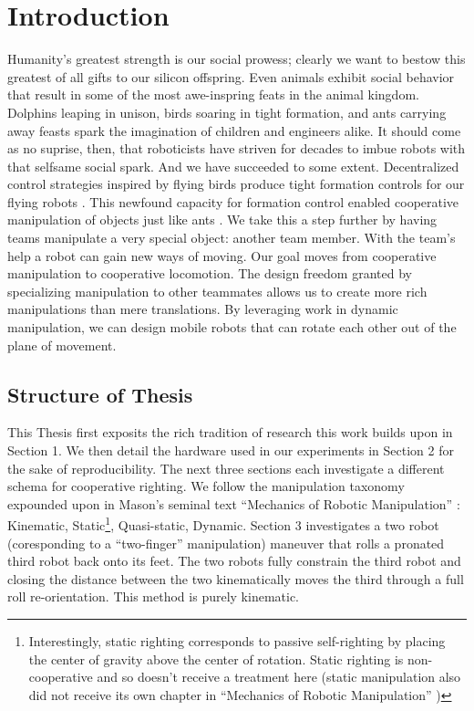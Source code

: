 \documentclass[letterpaper]{report}
\begin{document}
\section{Introduction}
Humanity's greatest strength is our social prowess; clearly we want to bestow this greatest of all gifts to our silicon offspring.
Even animals exhibit social behavior that result in some of the most awe-inspring feats in the animal kingdom.
Dolphins leaping in unison, birds soaring in tight formation, and ants carrying away feasts spark the imagination of children and engineers alike.
It should come as no suprise, then, that roboticists have striven for decades to imbue robots with that selfsame social spark.
And we have succeeded to some extent.
Decentralized control strategies inspired by flying birds \cite{reynolds1987flocks} produce tight formation controls for our flying robots \cite{RealBoids}.
This newfound capacity for formation control enabled cooperative manipulation of objects \cite{rus1995moving,sugar2002control,spletzer2001cooperative,song2002potential} just like ants \cite{kube2000cooperative}.
We take this a step further by having teams manipulate a very special object: another team member.
With the team's help a robot can gain new ways of moving.
Our goal moves from cooperative manipulation to cooperative locomotion.
The design freedom granted by specializing manipulation to other teammates allows us to create more rich manipulations than mere translations.
By leveraging work in dynamic manipulation, we can design mobile robots that can rotate each other out of the plane of movement.

\subsection{Structure of Thesis}
This Thesis first exposits the rich tradition of research this work builds upon in Section 1.
We then detail the hardware used in our experiments in Section 2 for the sake of reproducibility.
The next three sections each investigate a different schema for cooperative righting.
We follow the manipulation taxonomy expounded upon in Mason's seminal text ``Mechanics of Robotic Manipulation'' \cite{MasonMORMBook}: Kinematic, Static\footnote{Interestingly, static righting corresponds to passive self-righting by placing the center of gravity above the center of rotation. Static righting is non-cooperative and so doesn't receive a treatment here (static manipulation also did not receive its own chapter in ``Mechanics of Robotic Manipulation'' \cite{MasonMORMBook})}, Quasi-static, Dynamic.
Section 3 investigates a two robot (coresponding to a ``two-finger'' manipulation) maneuver that rolls a pronated third robot back onto its feet.
The two robots fully constrain the third robot and closing the distance between the two kinematically moves the third through a full roll re-orientation.
This method is purely kinematic.
\end{document}
